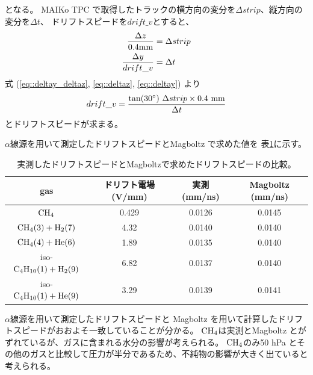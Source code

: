 となる。
MAIKo TPC で取得したトラックの横方向の変分を$\Delta strip$、縦方向の変分を$\Delta t$、
ドリフトスピードを$drift\_v$とすると、
\begin{align}
  \frac{\Delta z}{0.4 {\rm mm}} & = \Delta strip \label{eq::deltaz}\\
  \frac{\Delta y}{drift\_v} & = \Delta t \label{eq::deltay}
\end{align}
式 (\ref{eq::deltay_deltaz}, \ref{eq::deltaz}, \ref{eq::deltay}) より
\begin{equation}
  drift\_v = \frac{\tan(30^{\circ})~\Delta strip\times0.4~{\rm mm}}{\Delta t}
\end{equation}
とドリフトスピードが求まる。

$\alpha$線源を用いて測定したドリフトスピードとMagboltz で求めた値を
表\ref{tab::drift_speed_compare}に示す。
\begin{table}
  \centering
  \caption{実測したドリフトスピードとMagboltzで求めたドリフトスピードの比較。}
  \label{tab::drift_speed_compare}
  \begin{tabular}{cccc}
    \toprule
    gas & ドリフト電場 (V/mm) & 実測 (mm/ns) & Magboltz (mm/ns)\\
    \midrule
    ${\rm CH_{4}}$ & 0.429 & 0.0126 & 0.0145 \\
    ${\rm CH_{4}} (3) + {\rm H_{2}} (7)$ & 4.32 & 0.0140 & 0.0140 \\
    ${\rm CH_{4}} (4) + {\rm He} (6)$ & 1.89 & 0.0135 & 0.0140 \\
    iso-${\rm C_{4}H_{10}} (1) + {\rm H_{2}} (9)$ & 6.82 & 0.0137 & 0.0140 \\
    iso-${\rm C_{4}H_{10}} (1) + {\rm He} (9)$ & 3.29 & 0.0139 & 0.0141 \\
    \bottomrule
  \end{tabular}
\end{table}
$\alpha$線源を用いて測定したドリフトスピードと Magboltz を用いて計算したドリフトスピードがおおよそ一致していることが分かる。
$\rm CH_{4}$は実測とMagboltz とがずれているが、ガスに含まれる水分の影響が考えられる。
$\rm CH_{4}$のみ50 hPa とその他のガスと比較して圧力が半分であるため、不純物の影響が大きく出ていると考えられる。

